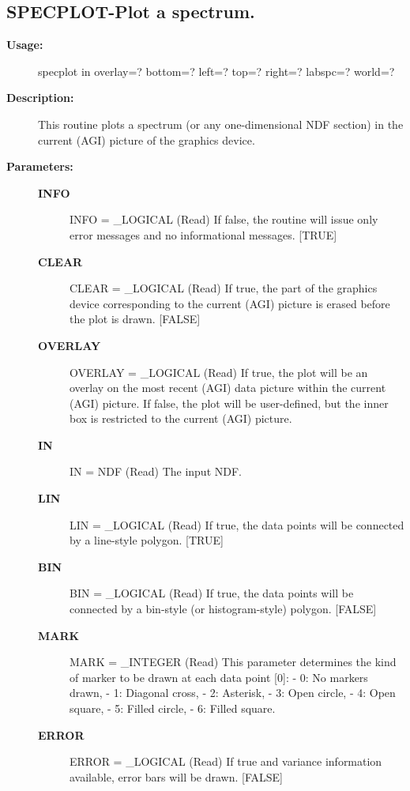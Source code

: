 \subsection{SPECPLOT-\label{SPECPLOT}Plot a spectrum.}
\begin{description}

\item [{\bf Usage:}]

   specplot in overlay=? bottom=? left=? top=? right=?
      labspc=? world=?


\item [{\bf Description:}]

   This routine plots a spectrum (or any one-dimensional NDF section)
   in the current (AGI) picture of the graphics device.


\item [{\bf Parameters:}]
\begin{description}
\item [{\bf INFO}]
INFO = _LOGICAL (Read)
   If false, the routine will issue only error messages and no
   informational messages. [TRUE]
\item [{\bf CLEAR}]
CLEAR = _LOGICAL (Read)
   If true, the part of the graphics device corresponding to the
   current (AGI) picture is erased before the plot is drawn.
   [FALSE]
\item [{\bf OVERLAY}]
OVERLAY = _LOGICAL (Read)
   If true, the plot will be an overlay on the most recent (AGI)
   data picture within the current (AGI) picture.
   If false, the plot will be user-defined, but the inner box is
   restricted to the current (AGI) picture.
\item [{\bf IN}]
IN = NDF (Read)
   The input NDF.
\item [{\bf LIN}]
LIN = _LOGICAL (Read)
   If true, the data points will be connected by a line-style
   polygon. [TRUE]
\item [{\bf BIN}]
BIN = _LOGICAL (Read)
   If true, the data points will be connected by a bin-style (or
   histogram-style) polygon. [FALSE]
\item [{\bf MARK}]
MARK = _INTEGER (Read)
   This parameter determines the kind of marker to be drawn at
   each data point [0]:
   -  0: No markers drawn,
   -  1: Diagonal cross,
   -  2: Asterisk,
   -  3: Open circle,
   -  4: Open square,
   -  5: Filled circle,
   -  6: Filled square.
\item [{\bf ERROR}]
ERROR = _LOGICAL (Read)
   If true and variance information available, error bars will be
   drawn. [FALSE]

\end{description}
\end{description}
